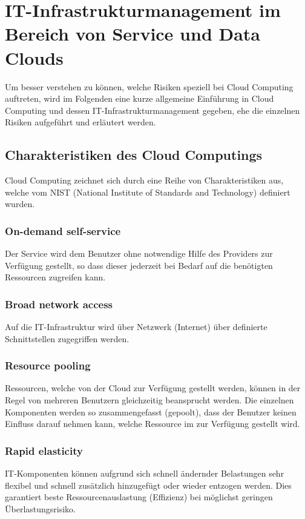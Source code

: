 \documentclass[a4paper,11pt]{article}
\begin{document}
\section{IT-Infrastrukturmanagement im Bereich von Service und Data Clouds}
Um besser verstehen zu können, welche Risiken speziell bei Cloud Computing auftreten, wird im Folgenden eine kurze allgemeine Einführung in Cloud Computing und dessen IT-Infrastrukturmanagement gegeben, ehe die einzelnen Risiken aufgeführt und erläutert werden. \cite{koe2013} \cite{haa2013}

\subsection{Charakteristiken des Cloud Computings}
Cloud Computing zeichnet sich durch eine Reihe von Charakteristiken aus, welche vom NIST (National Institute of Standards and Technology) definiert wurden.

\subsubsection{On-demand self-service}
Der Service wird dem Benutzer ohne notwendige Hilfe des Providers zur Verfügung gestellt, so dass dieser jederzeit bei Bedarf auf die benötigten Ressourcen zugreifen kann.

\subsubsection{Broad network access}
Auf die IT-Infrastruktur wird über Netzwerk (Internet) über definierte Schnittstellen zugegriffen werden.

\subsubsection{Resource pooling}
Ressourcen, welche von der Cloud zur Verfügung gestellt werden, können in der Regel von mehreren Benutzern gleichzeitig beansprucht werden. Die einzelnen Komponenten werden so zusammengefasst (gepoolt), dass der Benutzer keinen Einfluss darauf nehmen kann, welche Ressource im zur Verfügung gestellt wird.

\subsubsection{Rapid elasticity}
IT-Komponenten können aufgrund sich schnell ändernder Belastungen sehr flexibel und schnell zusätzlich hinzugefügt oder wieder entzogen werden. Dies garantiert beste Ressourcenauslastung (Effizienz) bei möglichst geringen Überlastungsrisiko.
\end{document}
